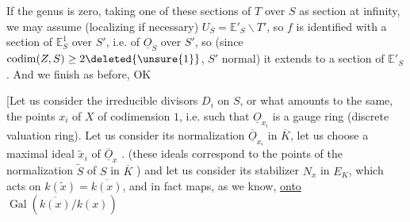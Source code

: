 If the genus is zero, taking one of these sections of $T$ over $S$ as section at infinity, we may assume (localizing if necessary) $U_S=\mathbb E'_S\smallsetminus T'$, so $f$ is identified with a section of $\mathbb E^1_S$ over $S'$, i.e. of $\underline O_S$ over $S'$, so (since $\operatorname{codim}(Z,S)\geq2\deleted{\unsure{1}}$, $S'$ normal) it extends to a section of $\mathbb E'_S$. And we finish as before, OK

[Let us consider  the irreducible divisors $D_i$ on $S$, or what amounts to the same, the points $x_i$ of $X$ of codimension $1$, i.e. such that $\underline O_{x_i}$ is a gauge ring (discrete valuation ring). Let us consider its normalization $\overline{\underline O}_{x_i}$ in $\overline K$, let us choose a maximal ideal $\widetilde x_i$ of $\overline{\underline O}_x$ . (these ideals correspond to the points of the normalization $\widetilde S$ of $S$ in $\overline K$ ) and let us consider its stabilizer $N_x$ in  $E_K$, which acts  on $k(\widetilde x)=\overline{k(x)}$, and in fact maps, as we know, \uline{onto} $\operatorname{Gal}(\overline{k(x)}/k(x))$
